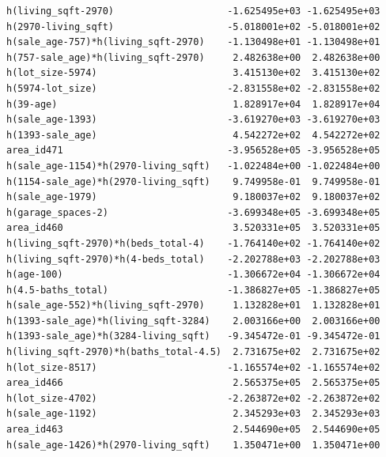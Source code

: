 \documentclass[
]{article}
\begin{document}
\begin{verbatim}
h(living_sqft-2970)                    -1.625495e+03 -1.625495e+03
h(2970-living_sqft)                    -5.018001e+02 -5.018001e+02
h(sale_age-757)*h(living_sqft-2970)    -1.130498e+01 -1.130498e+01
h(757-sale_age)*h(living_sqft-2970)     2.482638e+00  2.482638e+00
h(lot_size-5974)                        3.415130e+02  3.415130e+02
h(5974-lot_size)                       -2.831558e+02 -2.831558e+02
h(39-age)                               1.828917e+04  1.828917e+04
h(sale_age-1393)                       -3.619270e+03 -3.619270e+03
h(1393-sale_age)                        4.542272e+02  4.542272e+02
area_id471                             -3.956528e+05 -3.956528e+05
h(sale_age-1154)*h(2970-living_sqft)   -1.022484e+00 -1.022484e+00
h(1154-sale_age)*h(2970-living_sqft)    9.749958e-01  9.749958e-01
h(sale_age-1979)                        9.180037e+02  9.180037e+02
h(garage_spaces-2)                     -3.699348e+05 -3.699348e+05
area_id460                              3.520331e+05  3.520331e+05
h(living_sqft-2970)*h(beds_total-4)    -1.764140e+02 -1.764140e+02
h(living_sqft-2970)*h(4-beds_total)    -2.202788e+03 -2.202788e+03
h(age-100)                             -1.306672e+04 -1.306672e+04
h(4.5-baths_total)                     -1.386827e+05 -1.386827e+05
h(sale_age-552)*h(living_sqft-2970)     1.132828e+01  1.132828e+01
h(1393-sale_age)*h(living_sqft-3284)    2.003166e+00  2.003166e+00
h(1393-sale_age)*h(3284-living_sqft)   -9.345472e-01 -9.345472e-01
h(living_sqft-2970)*h(baths_total-4.5)  2.731675e+02  2.731675e+02
h(lot_size-8517)                       -1.165574e+02 -1.165574e+02
area_id466                              2.565375e+05  2.565375e+05
h(lot_size-4702)                       -2.263872e+02 -2.263872e+02
h(sale_age-1192)                        2.345293e+03  2.345293e+03
area_id463                              2.544690e+05  2.544690e+05
h(sale_age-1426)*h(2970-living_sqft)    1.350471e+00  1.350471e+00
                                                    

\end{verbatim}
\end{document}

